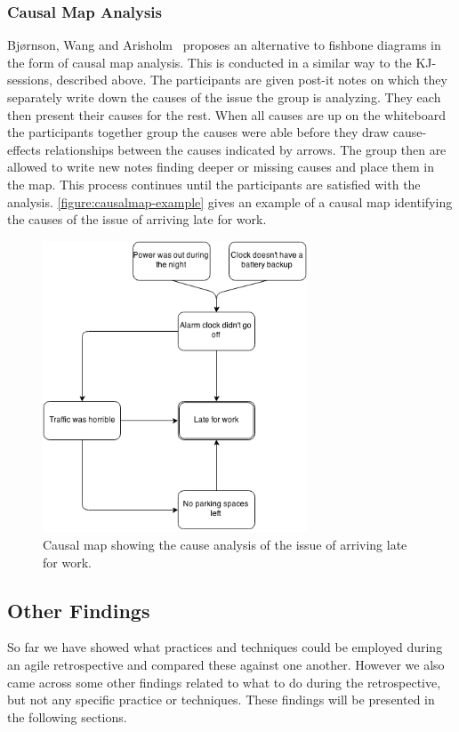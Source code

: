 \documentclass[12pt]{article}
\begin{document}
\subsubsection{Causal Map Analysis}
Bjørnson, Wang and Arisholm~\cite{Wang2012} proposes an alternative to fishbone diagrams in the form of causal map analysis. This is conducted in a similar way to the KJ-sessions, described above. The participants are given post-it notes on which they separately write down the causes of the issue the group is analyzing. They each then present their causes for the rest. When all causes are up on the whiteboard the participants together group the causes were able before they draw cause-effects relationships between the causes indicated by arrows. The group then are allowed to write new notes finding deeper or missing causes and place them in the map. This process continues until the participants are satisfied with the analysis. \autoref{figure:causalmap-example} gives an example of a causal map identifying the causes of the issue of arriving late for work.

\begin{figure}[h!]
	\centering
	\includegraphics[width=0.7\textwidth]{figures/causalmap-example.png}
	\caption{Causal map showing the cause analysis of the issue of arriving late for work.}
	\label{figure:causalmap-example}
\end{figure}

\subsection{Other Findings} 
So far we have showed what practices and techniques could be employed during an agile retrospective and compared these against one another. However we also came across some other findings related to what to do during the retrospective, but not any specific practice or techniques. These findings will be presented in the following sections. 
\end{document}
